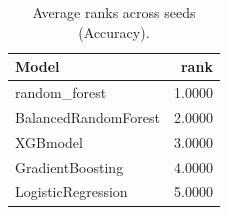 \begin{table}[t]
\centering
\begin{tabular}{lr}
\toprule
Model & rank \\
\midrule
random_forest & 1.0000 \\
BalancedRandomForest & 2.0000 \\
XGBmodel & 3.0000 \\
GradientBoosting & 4.0000 \\
LogisticRegression & 5.0000 \\
\bottomrule
\end{tabular}
\caption{Average ranks across seeds (Accuracy).}
\label{tab:avg_rank_Accuracy}
\end{table}
